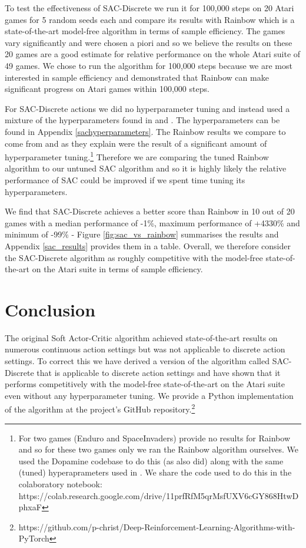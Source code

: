 \documentclass{article}
\begin{document}
To test the effectiveness of SAC-Discrete we run it for 100,000 steps on 20 Atari games for 5 random seeds each and compare its results with Rainbow which is a state-of-the-art model-free algorithm in terms of sample efficiency.  The games vary significantly and were chosen a piori and so we believe the results on these 20 games are a good estimate for relative performance on the whole Atari suite of 49 games.  We chose to run the algorithm for 100,000 steps because we are most interested in sample efficiency and \citet{model-Atari} demonstrated that Rainbow can make significant progress on Atari games within 100,000 steps.

For SAC-Discrete actions we did no hyperparameter tuning and instead used a mixture of the hyperparameters found in \citet{SACapplications} and \citet{model-Atari}. The hyperparameters can be found in Appendix \ref{sachyperparameters}. The Rainbow results we compare to come from \citet{model-Atari} and as they explain were the result of a significant amount of hyperparameter tuning.\footnote{For two games (Enduro and SpaceInvaders) \citet{model-Atari} provide no results for Rainbow and so for these two games only we ran the Rainbow algorithm ourselves. We used the Dopamine \parencite{dopamine} codebase to do this (as \citet{model-Atari} also did) along with the same (tuned) hyperaprameters used in \citet{model-Atari}. We share the code used to do this in the colaboratory notebook: https://colab.research.google.com/drive/11prfRfM5qrMsfUXV6cGY868HtwDphxaF} Therefore we are comparing the tuned Rainbow algorithm to our untuned SAC algorithm and so it is highly likely the relative performance of SAC could be improved if we spent time tuning its hyperparameters. 

We find that SAC-Discrete achieves a better score than Rainbow in 10 out of 20 games with a median performance of -1\%, maximum performance of +4330\% and minimum of -99\% - Figure \ref{fig:sac_vs_rainbow} summarises the results and Appendix \ref{sac_results} provides them in a table. Overall, we therefore consider the SAC-Discrete algorithm as roughly competitive with the model-free state-of-the-art on the Atari suite in terms of sample efficiency. 

\section{Conclusion}

The original Soft Actor-Critic algorithm achieved state-of-the-art results on numerous continuous action settings but was not applicable to discrete action settings. To correct this we have derived a version of the algorithm called SAC-Discrete that is applicable to discrete action settings and have shown that it performs competitively with the model-free state-of-the-art on the Atari suite even without any hyperparameter tuning. We provide a Python implementation of the algorithm at the project's GitHub repository.\footnote{https://github.com/p-christ/Deep-Reinforcement-Learning-Algorithms-with-PyTorch}   
\end{document}
